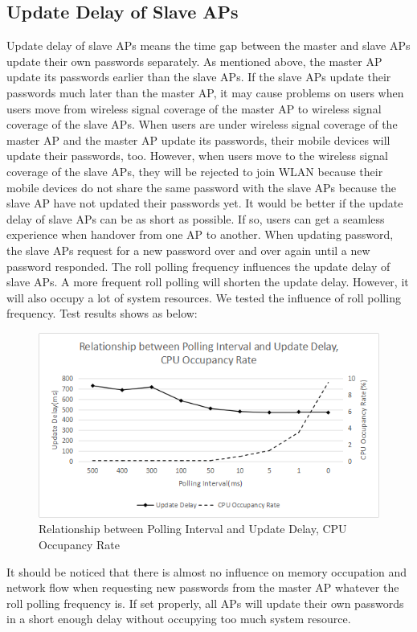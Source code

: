 \subsection{Update Delay of Slave APs}
Update delay of slave APs means the time gap between the master and slave APs update their own passwords separately. As mentioned above, the master AP update its passwords earlier than the slave APs. If the slave APs update their passwords much later than the master AP, it may cause problems on users when users move from wireless signal coverage of the master AP to wireless signal coverage of the slave APs. When users are under wireless signal coverage of the master AP and the master AP update its passwords, their mobile devices will update their passwords, too. However, when users move to the wireless signal coverage of the slave APs, they will be rejected to join WLAN because their mobile devices do not share the same password with the slave APs because the slave AP have not updated their passwords yet. It would be better if the update delay of slave APs can be as short as possible. If so, users can get a seamless experience when handover from one AP to another. When updating password, the slave APs request for a new password over and over again until a new password responded. The roll polling frequency influences the update delay of slave APs. A more frequent roll polling will shorten the update delay. However, it will also occupy a lot of system resources. We tested the influence of roll polling frequency. Test results shows as below: 
\begin{figure}
	\begin{center}
		\includegraphics[width=\textwidth]{Results2.png}
		\caption{Relationship between Polling Interval and Update Delay, CPU Occupancy Rate}
		\label{Fig:5.2}
	\end{center}
\end{figure}
It should be noticed that there is almost no influence on memory occupation and network flow when requesting new passwords from the master AP whatever the roll polling frequency is. If set properly, all APs will update their own passwords in a short enough delay without occupying too much system resource. 
